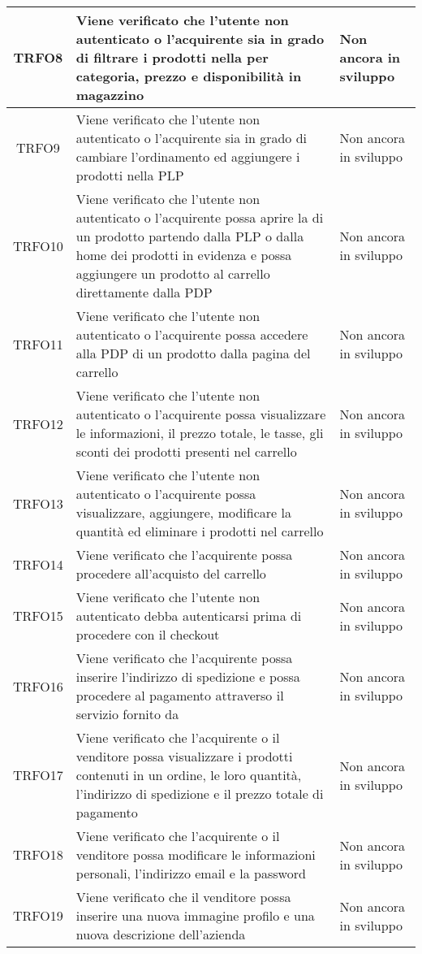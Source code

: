 \begin{longtable}{|c| C{10cm} |C{3cm}|}
	TRFO8 & Viene verificato che l'utente non autenticato o l'acquirente sia in grado di filtrare i prodotti nella  per categoria, prezzo e disponibilità in magazzino & Non ancora in sviluppo\\ \hline
	TRFO9 & Viene verificato che l'utente non autenticato o l'acquirente sia in grado di cambiare l'ordinamento ed aggiungere i prodotti nella PLP & Non ancora in sviluppo\\ \hline
	TRFO10 & Viene verificato che l'utente non autenticato o l'acquirente possa aprire la  di un prodotto partendo dalla PLP o dalla home dei prodotti in evidenza e possa aggiungere un prodotto al carrello direttamente dalla PDP & Non ancora in sviluppo\\ \hline
	TRFO11 & Viene verificato che l'utente non autenticato o l'acquirente possa accedere alla PDP di un prodotto dalla pagina del carrello & Non ancora in sviluppo\\ \hline
    TRFO12 & Viene verificato che l'utente non autenticato o l'acquirente possa visualizzare le informazioni, il prezzo totale, le tasse, gli sconti dei prodotti presenti nel carrello & Non ancora in sviluppo\\ \hline
    TRFO13 & Viene verificato che l'utente non autenticato o l'acquirente possa visualizzare, aggiungere, modificare la quantità ed eliminare i prodotti nel carrello & Non ancora in sviluppo\\ \hline
    TRFO14 & Viene verificato che l'acquirente possa procedere all'acquisto del carrello & Non ancora in sviluppo\\ \hline
    TRFO15 & Viene verificato che l'utente non autenticato debba autenticarsi prima di procedere con il checkout & Non ancora in sviluppo\\ \hline
    TRFO16 & Viene verificato che l'acquirente possa inserire l'indirizzo di spedizione e possa procedere al pagamento attraverso il servizio fornito da  & Non ancora in sviluppo\\ \hline
	TRFO17 & Viene verificato che l'acquirente o il venditore possa visualizzare i prodotti contenuti in un ordine, le loro quantità, l'indirizzo di spedizione e il prezzo totale di pagamento & Non ancora in sviluppo\\ \hline
	TRFO18 & Viene verificato che l'acquirente o il venditore possa modificare le informazioni personali, l'indirizzo email e la password & Non ancora in sviluppo\\ \hline
	TRFO19 & Viene verificato che il venditore possa inserire una nuova immagine profilo e una nuova descrizione dell'azienda & Non ancora in sviluppo\\ \hline

\end{longtable}

